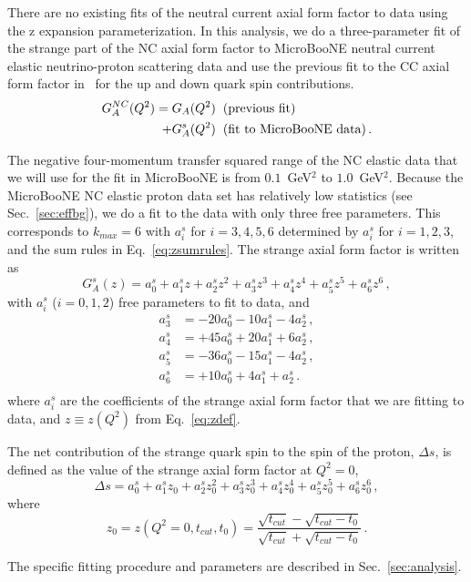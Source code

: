  There are no existing fits of the neutral current axial form factor to data
  using the z expansion parameterization. In this analysis, we do a
  three-parameter fit of the strange part of the NC axial form factor to
  MicroBooNE neutral current elastic neutrino-proton scattering data and use
  the previous fit to the CC axial form factor in~\cite{Meyer:2016oeg} for the
  up and down quark spin contributions.
  \begin{align*}
    G_A^{NC}(Q^2) = G_A(Q^2) \hspace{2mm} &(\textrm{previous fit}) \\
                + G_A^s(Q^2) \hspace{2mm} &(\textrm{fit to MicroBooNE data}) \,.
  \end{align*}

  The negative four-momentum transfer squared range of the NC elastic data that
  we will use for the fit in MicroBooNE is from $0.1$~GeV$^2$ to $1.0$~GeV$^2$.
  Because the MicroBooNE NC elastic proton data set has relatively low
  statistics (see Sec.~\ref{sec:effbg}), we do a fit to the data with only
  three free parameters. This corresponds to $k_{max} = 6$ with $a_i^s$ for
  $i=3,4,5,6$ determined by $a_i^s$ for $i=1,2,3$, and the sum rules in
  Eq.~\ref{eq:zsumrules}. The strange axial form factor is written as
  \begin{equation}
    G_A^s(z) = a_0^s + a_1^s z + a_2^s z^2 
      + a_3^s z^3 + a_4^s z^4 + a_5^s z^5 + a_6^s z^6 \,,
  \end{equation}
  with $a_i^s$ ($i=0,1,2$) free parameters to fit to data, and
  \begin{align*}
    a_3^s &= - 20 a_0^s - 10 a_1^s - 4 a_2^s \,,\\
    a_4^s &= + 45 a_0^s + 20 a_1^s + 6 a_2^s \,, \\
    a_5^s &= - 36 a_0^s - 15 a_1^s - 4 a_2^s \,, \\
    a_6^s &= + 10 a_0^s + 4 a_1^s + a_2^s \,. \\
  \end{align*}
  where $a_i^s$ are the coefficients of the strange axial form factor that we
  are fitting to data, and $z \equiv z(Q^2)$ from Eq.~\ref{eq:zdef}.

  The net contribution of the strange quark spin to the spin of the proton,
  $\Delta s$, is defined as the value of the strange axial form factor at $Q^2
  = 0$,
  \begin{equation}
    \Delta s = a_0^s + a_1^s z_0 + a_2^s z_0^2 
      + a_3^s z_0^3 + a_4^s z_0^4 + a_5^s z_0^5 + a_6^s z_0^6 \,,
  \end{equation}
  where
  \begin{equation*}
    z_0 = z(Q^2 = 0,t_{cut},t_0) = \frac{\sqrt{t_{cut}} - \sqrt{t_{cut} - t_0}}{\sqrt{t_{cut}} + \sqrt{t_{cut} - t_0}} \,.
  \end{equation*}

  The specific fitting procedure and parameters are described in
  Sec.~\ref{sec:analysis}.


